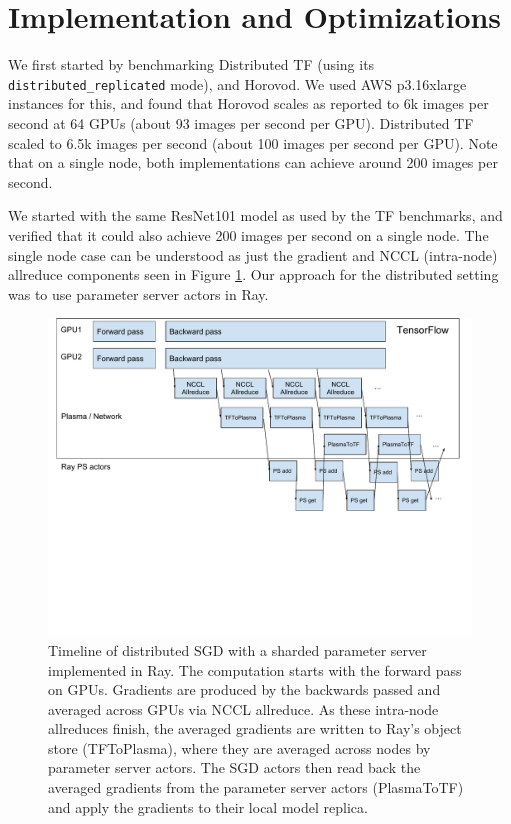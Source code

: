 \section{Implementation and Optimizations}
We first started by benchmarking Distributed TF (using its \texttt{distributed\_replicated} mode), and Horovod. We used AWS p3.16xlarge instances for this, and found that Horovod scales as reported to 6k images per second at 64 GPUs (about 93 images per second per GPU). Distributed TF scaled to 6.5k images per second (about 100 images per second per GPU). Note that on a single node, both implementations can achieve around 200 images per second.

We started with the same ResNet101 model as used by the TF benchmarks, and verified that it could also achieve 200 images per second on a single node. The single node case can be understood as just the gradient and NCCL (intra-node) allreduce components seen in Figure \ref{fig:pipeline}. Our approach for the distributed setting was to use parameter server actors in Ray.

\begin{figure}
    \centering
    \includegraphics[width=5.1in,keepaspectratio]{fig/pipeline.pdf}
    \caption{
    \small{
        Timeline of distributed SGD with a sharded parameter server implemented in Ray. The computation starts with the forward pass on GPUs. Gradients are produced by the backwards passed and averaged across GPUs via NCCL allreduce. As these intra-node allreduces finish, the averaged gradients are written to Ray's object store (TFToPlasma), where they are averaged across nodes by parameter server actors. The SGD actors then read back the averaged gradients from the parameter server actors (PlasmaToTF) and apply the gradients to their local model replica.
    }
    }
    \label{fig:pipeline}
\end{figure}

